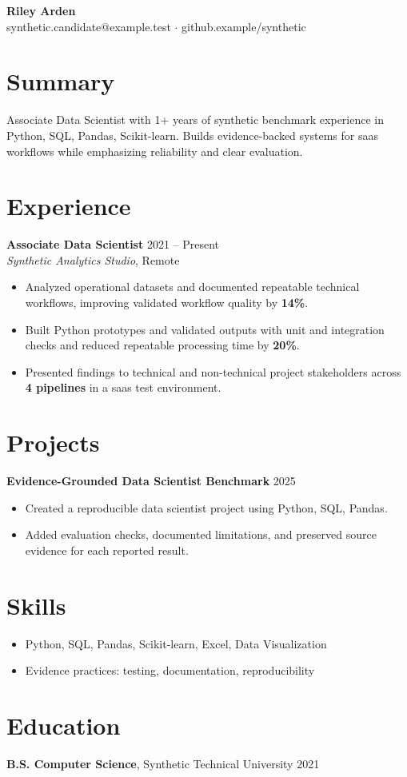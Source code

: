 \documentclass[10pt,letterpaper]{article}
\newcommand{\resumeItem}[1]{\item #1}
\newcommand{\resumeItemListStart}{\begin{itemize}[leftmargin=*]}
\newcommand{\resumeItemListEnd}{\end{itemize}}
\begin{document}
\begin{center}
{\Large \textbf{Riley Arden}}\\
synthetic.candidate@example.test $\cdot$ github.example/synthetic
\end{center}

\section*{Summary}
Associate Data Scientist with 1+ years of synthetic benchmark experience in Python, SQL, Pandas, Scikit-learn. Builds evidence-backed systems for saas workflows while emphasizing reliability and clear evaluation.

\section*{Experience}
\textbf{Associate Data Scientist} \hfill 2021 -- Present\\
\textit{Synthetic Analytics Studio}, Remote
\resumeItemListStart
  \resumeItem{Analyzed operational datasets and documented repeatable technical workflows, improving validated workflow quality by \textbf{14\%}.}
  \resumeItem{Built Python prototypes and validated outputs with unit and integration checks and reduced repeatable processing time by \textbf{20\%}.}
  \resumeItem{Presented findings to technical and non-technical project stakeholders across \textbf{4 pipelines} in a saas test environment.}
\resumeItemListEnd

\section*{Projects}
\textbf{Evidence-Grounded Data Scientist Benchmark} \hfill 2025
\resumeItemListStart
  \resumeItem{Created a reproducible data scientist project using Python, SQL, Pandas.}
  \resumeItem{Added evaluation checks, documented limitations, and preserved source evidence for each reported result.}
\resumeItemListEnd

\section*{Skills}
\resumeItemListStart
  \resumeItem{Python, SQL, Pandas, Scikit-learn, Excel, Data Visualization}
  \resumeItem{Evidence practices: testing, documentation, reproducibility}
\resumeItemListEnd

\section*{Education}
\textbf{B.S. Computer Science}, Synthetic Technical University \hfill 2021
\end{document}
